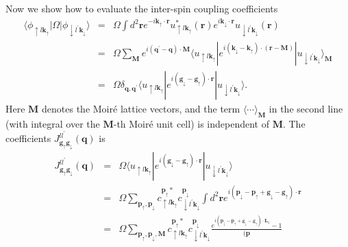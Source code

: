 \documentclass[twocolumn,english,prl,floatfix,citeautoscript,nofootinbib]{revtex4}
\begin{document}
\begin{widetext}
Now we show how to evaluate the inter-spin coupling coefficients
\begin{eqnarray}
\langle \phi _{\uparrow l\mathbf{k}_{\uparrow }}|\Omega |\phi _{\downarrow
l^{\prime }\mathbf{k}_{\downarrow }}\rangle &=&\Omega \int d^{2}\mathbf{r}%
e^{-i\mathbf{k}_{\uparrow }\cdot \mathbf{r}}u_{\uparrow l\mathbf{k}%
_{\uparrow }}^{\ast }(\mathbf{r})e^{i\mathbf{k}_{\downarrow }\cdot \mathbf{r}%
}u_{\downarrow l^{\prime }\mathbf{k}_{\downarrow }}(\mathbf{r})  \nonumber \\
&=&\Omega \sum_{\mathbf{M}}e^{i(\mathbf{q^{\prime }}-\mathbf{q})\cdot
\mathbf{M}}\langle u_{\uparrow l\mathbf{k}_{\uparrow }}|e^{i(\mathbf{k}%
_{\downarrow }-\mathbf{k}_{\uparrow })\cdot (\mathbf{r-M})}|u_{\downarrow
l^{\prime }\mathbf{k}_{\downarrow }}\rangle _{\mathbf{M}}  \nonumber \\
&=&\Omega \delta _{\mathbf{q},\mathbf{q}^{\prime }}\langle u_{\uparrow l%
\mathbf{k}_{\uparrow }}|e^{i(\mathbf{g}_{\downarrow }-\mathbf{g}_{\uparrow
})\cdot \mathbf{r}}|u_{\downarrow l^{\prime }\mathbf{k}_{\downarrow
}}\rangle .
\end{eqnarray}%
Here $\mathbf{M}$ denotes the Moir\'{e} lattice vectors, and the term $%
\langle \cdots \rangle _{\mathbf{M}}$ in the second line (with integral over
the $\mathbf{M}$-th Moir\'{e} unit cell) is independent of $\mathbf{M}$. The
coefficients $J_{\mathbf{g}_{\uparrow }\mathbf{g}_{\downarrow }}^{ll^{\prime
}}(\mathbf{q})$ is
\begin{eqnarray}
J_{\mathbf{g}_{\uparrow }\mathbf{g}_{\downarrow }}^{ll^{\prime }}(\mathbf{q}%
) &=&\Omega \langle u_{\uparrow l\mathbf{k}_{\uparrow }}|e^{i(\mathbf{g}%
_{\downarrow }-\mathbf{g}_{\uparrow })\cdot \mathbf{r}}|u_{\downarrow
l^{\prime }\mathbf{k}_{\downarrow }}\rangle  \nonumber \\
&=&\Omega \sum_{\mathbf{p}_{\uparrow },\mathbf{p}_{\downarrow }}c_{\uparrow l%
\mathbf{k}_{\uparrow }}^{\mathbf{p}_{\uparrow }\ast }c_{\downarrow l^{\prime
}\mathbf{k}_{\downarrow }}^{\mathbf{p}_{\downarrow }}\int d^{2}\mathbf{r}%
e^{i(\mathbf{p}_{\downarrow }-\mathbf{p}_{\uparrow }+\mathbf{g}_{\downarrow
}-\mathbf{g}_{\uparrow })\cdot \mathbf{r}}  \nonumber \\
&=&\Omega \sum_{\mathbf{p}_{\uparrow },\mathbf{p}_{\downarrow },\mathbf{M}%
}c_{\uparrow l\mathbf{k}_{\uparrow }}^{\mathbf{p}_{\uparrow }\ast
}c_{\downarrow l^{\prime }\mathbf{k}_{\downarrow }}^{\mathbf{p}_{\downarrow
}}\frac{e^{i(\mathbf{p}_{\downarrow }-\mathbf{p}_{\uparrow }+\mathbf{g}%
_{\downarrow }-\mathbf{g}_{\uparrow })\cdot \mathbf{L}_{1}}-1}{(\mathbf{p}%
}
\end{eqnarray}
\end{widetext}
\end{document}
